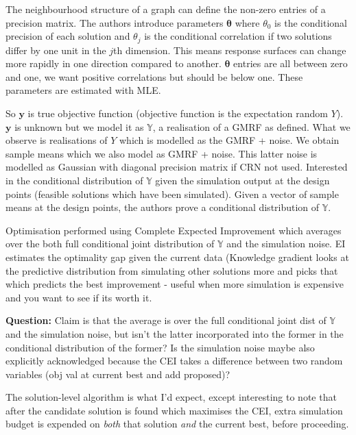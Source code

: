 \documentclass{article}
\begin{document}
The neighbourhood structure of a graph can define the non-zero entries of a precision matrix. The authors introduce parameters $\boldsymbol{\theta}$ where $\theta_0$ is the conditional precision of each solution and $\theta_j$ is the conditional correlation if two solutions differ by one unit in the $j$th dimension. This means response surfaces can change more rapidly in one direction compared to another. $\boldsymbol{\theta}$ entries are all between zero and one, we want positive correlations but should be below one. These parameters are estimated with MLE. \newline

So $\boldsymbol{y}$ is true objective function (objective function is the expectation random $Y$). $\boldsymbol{y}$ is unknown but we model it as $\mathbb{Y}$, a realisation of a GMRF as defined. What we observe is realisations of $Y$ which is modelled as the GMRF + noise. We obtain sample means which we also model as GMRF + noise. This latter noise is modelled as Gaussian with diagonal precision matrix if CRN not used. Interested in the conditional distribution of $\mathbb{Y}$ given the simulation output at the design points (feasible solutions which have been simulated). Given a vector of sample means at the design points, the authors prove a conditional distribution of $\mathbb{Y}$. \newline

Optimisation performed using Complete Expected Improvement which averages over the both full conditional joint distribution of $\mathbb{Y}$ and the simulation noise. EI estimates the optimality gap given the current data (Knowledge gradient looks at the predictive distribution from simulating other solutions more and picks that which predicts the best improvement - useful when more simulation is expensive and you want to see if its worth it. \newline

\textbf{Question: } Claim is that the average is over the full conditional joint dist of $\mathbb{Y}$ and the simulation noise, but isn't the latter incorporated into the former in the conditional distribution of the former? Is the simulation noise maybe also explicitly acknowledged because the CEI takes a difference between two random variables (obj val at current best and add proposed)? \newline

The solution-level algorithm is what I'd expect, except interesting to note that after the candidate solution is found which maximises the CEI, extra simulation budget is expended on \emph{both} that solution \emph{and} the current best, before proceeding. \newline
\end{document}
